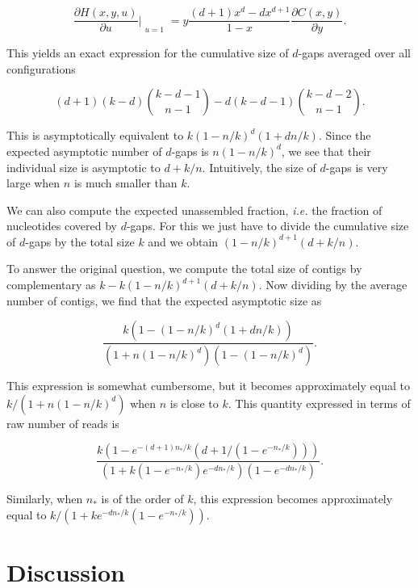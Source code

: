 \documentclass{article}
\begin{document}
\begin{equation*}
\frac{\partial H(x,y,u)}{\partial u}\Bigr|_{\substack{\\u=1}}
= y \frac{(d+1)x^d-dx^{d+1}}{1-x} \frac{\partial C(x,y)}
{\partial y}.
\end{equation*}

This yields an exact expression for the cumulative size of $d$-gaps
averaged over all configurations

\begin{equation}
(d+1)(k-d) {k-d-1 \choose n-1} -d(k-d-1) {k-d-2 \choose n-1}.
\end{equation}


This is asymptotically equivalent to $k(1-n/k)^d(1+dn/k)$.  Since the
expected asymptotic number of $d$-gaps is $n(1-n/k)^d$, we see that their
individual size is asymptotic to $d+k/n$. Intuitively, the size
of $d$-gaps is very large when $n$ is much smaller than $k$.

We can also compute the expected unassembled fraction, \textit{i.e.} the
fraction of nucleotides covered by $d$-gaps. For this we just have to
divide the cumulative size of $d$-gaps by the total size $k$ and we obtain
$(1-n/k)^{d+1}(d+k/n)$.

To answer the original question, we compute the total size of contigs by
complementary as $k-k(1-n/k)^{d+1}(d+k/n)$. Now dividing by the
average number of contigs, we find that the expected asymptotic size as

\begin{equation}
\frac{k(1-(1-n/k)^d(1+dn/k))}
{\left(1+n(1-n/k)^d\right)\left(1-(1-n/k)^d \right)}.
\end{equation}

This expression is somewhat cumbersome, but it becomes approximately equal
to $k/(1+n(1-n/k)^d)$ when $n$ is close to $k$. This quantity expressed in
terms of raw number of reads is

\begin{equation}
\frac{k\left( 1-e^{-(d+1)n_*/k}(d+1/(1-e^{-n_*/k})) \right)}
{( 1 + k(1-e^{-n_*/k})e^{-dn_*/k}) (1-e^{-dn_*/k})}.
\end{equation}

Similarly, when $n_*$ is of the order of $k$, this expression becomes
approximately equal to $k/(1+ke^{-dn_*/k}(1-e^{-n_*/k}))$.


\section{Discussion}
\end{document}
